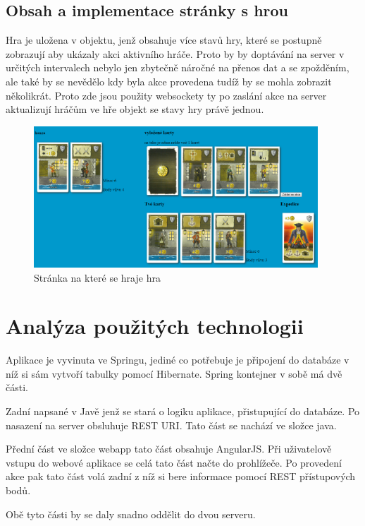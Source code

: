 \documentclass[czech,master,public,dept460,male,cpdeclaration,twoside]{diploma}
\begin{document}
\subsection{Obsah a implementace stránky s hrou}
Hra je uložena v objektu, jenž obsahuje více stavů hry, které se postupně zobrazují aby ukázaly akci aktivního hráče. Proto by by doptávání na server v určitých intervalech nebylo jen zbytečně náročné na přenos dat a se zpožděním, ale také by se nevědělo kdy byla akce provedena tudíž by se mohla zobrazit několikrát. Proto zde jsou použity websockety ty po zaslání akce na server aktualizují hráčům ve hře objekt se stavy hry právě jednou.
\begin{figure}[H]
\centering\includegraphics[width=0.95\textwidth]{Figures/gamepage.png}\caption{Stránka na které se hraje hra}
\end{figure}


\section{Analýza použitých technologii}
Aplikace je vyvinuta ve Springu, jediné co potřebuje je připojení do databáze v níž si sám vytvoří tabulky pomocí Hibernate. Spring kontejner v sobě má dvě části.

Zadní napsané v Javě jenž se stará o logiku aplikace, přistupující do databáze. Po nasazení na server obsluhuje REST URI. Tato část se nachází ve složce java. 

Přední část ve složce webapp tato část obsahuje AngularJS. Při uživatelově vstupu do webové aplikace se celá tato část načte do prohlížeče. Po provedení akce pak tato část volá zadní z níž si bere informace pomocí REST přístupových bodů.

Obě tyto části by se daly snadno oddělit do dvou serveru.
\end{document}
